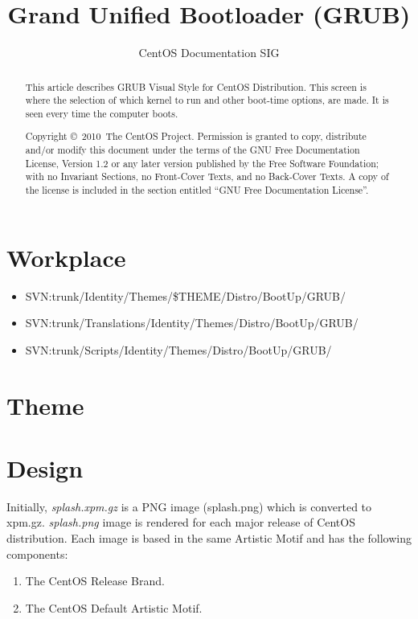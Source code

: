 \documentclass{article}
\title{Grand Unified Bootloader (GRUB)}
\author{CentOS Documentation SIG}
\begin{document}
\maketitle

\begin{abstract} 
This article describes GRUB Visual Style for CentOS Distribution.
This screen is where the selection of which kernel to run and other
boot-time options, are made. It is seen every time the computer boots.

Copyright \copyright\ 2010\ The CentOS Project. Permission is
granted to copy, distribute and/or modify this document under the
terms of the GNU Free Documentation License, Version 1.2 or any later
version published by the Free Software Foundation; with no Invariant
Sections, no Front-Cover Texts, and no Back-Cover Texts. A copy of the
license is included in the section entitled ``GNU Free Documentation
License''.  
\end{abstract}

\tableofcontents

\section{Workplace}

\begin{itemize}
\item SVN:trunk/Identity/Themes/\$THEME/Distro/BootUp/GRUB/
\item SVN:trunk/Translations/Identity/Themes/Distro/BootUp/GRUB/
\item SVN:trunk/Scripts/Identity/Themes/Distro/BootUp/GRUB/
\end{itemize}

\section{Theme}



\section{Design}

Initially, \emph{splash.xpm.gz} is a PNG image (splash.png) which is
converted to xpm.gz. \emph{splash.png} image is rendered for each
major release of CentOS distribution.  Each image is based in the same
Artistic Motif and has the following components:

\begin{enumerate}
\item The CentOS Release Brand.
\item The CentOS Default Artistic Motif.
\end{enumerate}
\end{document}
